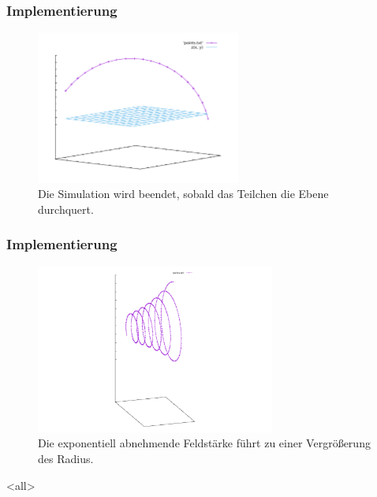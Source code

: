 \begin{frame}
  \frametitle{Implementierung}
  \begin{figure}
    \centering
    \includegraphics[width=0.6\textwidth]{../gnuplot/stop_plane}
    \caption{Die Simulation wird beendet, sobald das Teilchen die Ebene durchquert.}
    \label{fig:stop_plane}
  \end{figure}
\end{frame}

\begin{frame}
  \frametitle{Implementierung}
  \begin{figure}
    \centering
    \includegraphics[width=0.7\textwidth]{../gnuplot/fading_field}
    \caption{Die exponentiell abnehmende Feldst\"arke f\"uhrt zu einer Vergr\"o{\ss}erung des Radius.}
    \label{fig:fading_field}
  \end{figure}
\end{frame}

\mode<all>
